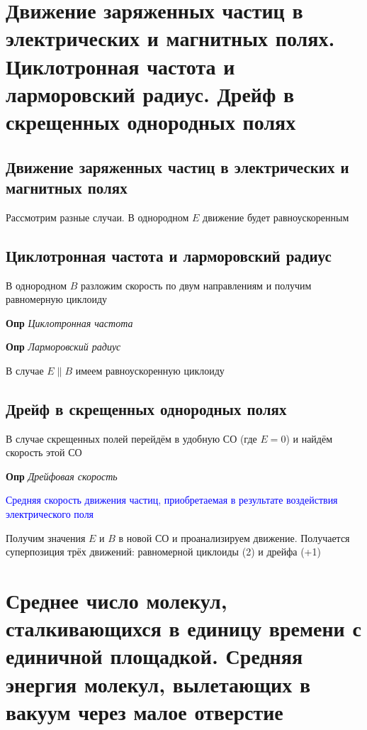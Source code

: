 \documentclass[a4paper, 14pt]{article}
\begin{document}
    \section{Движение заряженных частиц в электрических и магнитных полях.
    Циклотронная частота и ларморовский радиус.
    Дрейф в скрещенных однородных полях}
    
    \subsection{Движение заряженных частиц в электрических и магнитных полях}
    
    Рассмотрим разные случаи.
    В однородном $E$ движение будет равноускоренным
    
    \subsection{Циклотронная частота и ларморовский радиус}
    
    В однородном $B$ разложим скорость по двум направлениям и получим равномерную циклоиду
    
    \textbf{Опр} \textit{Циклотронная частота}
    
    \textbf{Опр} \textit{Ларморовский радиус}
    
    В случае $E \| B$ имеем равноускоренную циклоиду
    
    \subsection{Дрейф в скрещенных однородных полях}
    
В случае скрещенных полей перейдём в удобную СО (где $E = 0$) и найдём скорость этой СО
    
    \textbf{Опр} \textit{Дрейфовая скорость}
    
    \textcolor{blue}{Средняя скорость движения частиц, приобретаемая в результате воздействия электрического поля}
    
    Получим значения $E$ и $B$ в новой СО и проанализируем движение.
    Получается суперпозиция трёх движений: равномерной циклоиды (2) и дрейфа (+1)
    
    \section{Среднее число молекул, сталкивающихся в единицу времени с единичной площадкой.
    Средняя энергия молекул, вылетающих в вакуум через малое отверстие}
    
\end{document}
